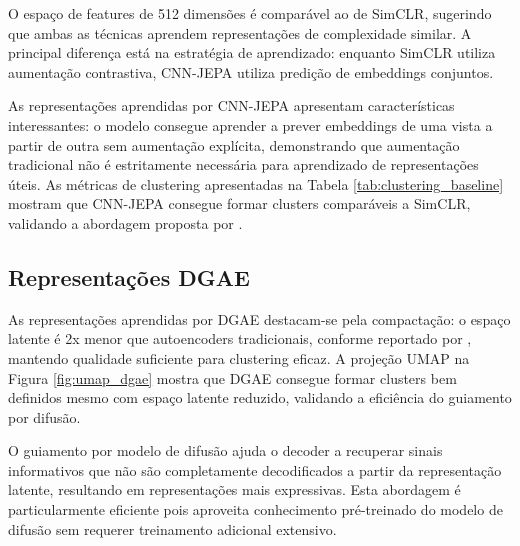 O espaço de features de 512 dimensões é comparável ao de SimCLR, sugerindo que ambas as técnicas aprendem representações de complexidade similar. A principal diferença está na estratégia de aprendizado: enquanto SimCLR utiliza aumentação contrastiva, CNN-JEPA utiliza predição de embeddings conjuntos.


As representações aprendidas por CNN-JEPA apresentam características interessantes: o modelo consegue aprender a prever embeddings de uma vista a partir de outra sem aumentação explícita, demonstrando que aumentação tradicional não é estritamente necessária para aprendizado de representações úteis. As métricas de clustering apresentadas na Tabela \ref{tab:clustering_baseline} mostram que CNN-JEPA consegue formar clusters comparáveis a SimCLR, validando a abordagem proposta por \cite{kalapos2025cnnjepa}.

\subsection{Representações DGAE}

As representações aprendidas por DGAE destacam-se pela compactação: o espaço latente é 2x menor que autoencoders tradicionais, conforme reportado por \cite{liu2025dgae}, mantendo qualidade suficiente para clustering eficaz. A projeção UMAP na Figura \ref{fig:umap_dgae} mostra que DGAE consegue formar clusters bem definidos mesmo com espaço latente reduzido, validando a eficiência do guiamento por difusão.

O guiamento por modelo de difusão ajuda o decoder a recuperar sinais informativos que não são completamente decodificados a partir da representação latente, resultando em representações mais expressivas. Esta abordagem é particularmente eficiente pois aproveita conhecimento pré-treinado do modelo de difusão sem requerer treinamento adicional extensivo.


